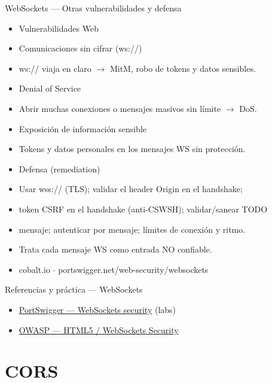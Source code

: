 \documentclass[aspectratio=169,10pt]{beamer}
\begin{document}
\begin{frame}[allowframebreaks]{WebSockets --- Otras vulnerabilidades y defensa}
\small
  \begin{itemize}
  \item Vulnerabilidades Web
  \item Comunicaciones sin cifrar (ws://)
  \item ws:// viaja en claro $\rightarrow$ MitM, robo de tokens y datos sensibles.
  \item Denial of Service
  \item Abrir muchas conexiones o mensajes masivos sin límite $\rightarrow$ DoS.
  \item Exposición de información sensible
  \item Tokens y datos personales en los mensajes WS sin protección.
  \item Defensa (remediation)
  \item Usar wss:// (TLS); validar el header Origin en el handshake;
  \item token CSRF en el handshake (anti-CSWSH); validar/sanear TODO
  \item mensaje; autenticar por mensaje; límites de conexión y ritmo.
  \item Trata cada mensaje WS como entrada NO confiable.
  \item cobalt.io $\cdot$ portswigger.net/web-security/websockets
  \end{itemize}
\end{frame}

\begin{frame}{Referencias y práctica --- WebSockets}
\footnotesize
  \begin{itemize}
  \item \href{https://portswigger.net/web-security/websockets}{PortSwigger --- WebSockets security} (labs)
  \item \href{https://cheatsheetseries.owasp.org/cheatsheets/HTML5_Security_Cheat_Sheet.html}{OWASP --- HTML5 / WebSockets Security}
  \end{itemize}
\end{frame}

\section{CORS}
\end{document}
